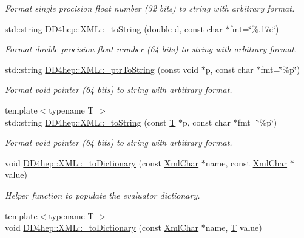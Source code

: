 \begin{DoxyCompactItemize}
\begin{DoxyCompactList}\small\item\em Format single procision float number (32 bits) to string with arbitrary format. \end{DoxyCompactList}\item 
std\+::string \hyperlink{group___d_d4_h_e_p___x_m_l_ga101954caf40eafb6b0bc58223764a3d4}{D\+D4hep\+::\+X\+M\+L\+::\+\_\+to\+String} (double d, const char $\ast$fmt=\char`\"{}\%.\+17e\char`\"{})
\begin{DoxyCompactList}\small\item\em Format double procision float number (64 bits) to string with arbitrary format. \end{DoxyCompactList}\item 
std\+::string \hyperlink{group___d_d4_h_e_p___x_m_l_ga38094fef4f65786fdece09b69b41d07b}{D\+D4hep\+::\+X\+M\+L\+::\+\_\+ptr\+To\+String} (const void $\ast$p, const char $\ast$fmt=\char`\"{}\%p\char`\"{})
\begin{DoxyCompactList}\small\item\em Format void pointer (64 bits) to string with arbitrary format. \end{DoxyCompactList}\item 
{\footnotesize template$<$typename T $>$ }\\std\+::string \hyperlink{group___d_d4_h_e_p___x_m_l_gaa022e4ea896faaded8ae9dec1ee003da}{D\+D4hep\+::\+X\+M\+L\+::\+\_\+to\+String} (const \hyperlink{class_t}{T} $\ast$p, const char $\ast$fmt=\char`\"{}\%p\char`\"{})
\begin{DoxyCompactList}\small\item\em Format void pointer (64 bits) to string with arbitrary format. \end{DoxyCompactList}\item 
void \hyperlink{group___d_d4_h_e_p___x_m_l_ga453206d36ab8257b39337846e5a1795d}{D\+D4hep\+::\+X\+M\+L\+::\+\_\+to\+Dictionary} (const \hyperlink{namespace_d_d4hep_1_1_x_m_l_a09e5d9cc86ed782f6826dfe0778c1815}{Xml\+Char} $\ast$name, const \hyperlink{namespace_d_d4hep_1_1_x_m_l_a09e5d9cc86ed782f6826dfe0778c1815}{Xml\+Char} $\ast$value)
\begin{DoxyCompactList}\small\item\em Helper function to populate the evaluator dictionary. \end{DoxyCompactList}\item 
{\footnotesize template$<$typename T $>$ }\\void \hyperlink{group___d_d4_h_e_p___x_m_l_ga50eac63a7d1b9077d329298a55c23d5e}{D\+D4hep\+::\+X\+M\+L\+::\+\_\+to\+Dictionary} (const \hyperlink{namespace_d_d4hep_1_1_x_m_l_a09e5d9cc86ed782f6826dfe0778c1815}{Xml\+Char} $\ast$name, \hyperlink{class_t}{T} value)

\end{DoxyCompactItemize}
